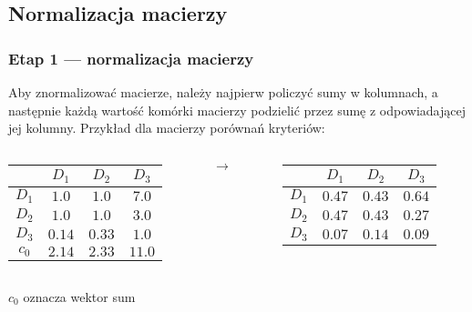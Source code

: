 \documentclass{beamer}
\begin{document}
\subsection{Normalizacja macierzy}
\begin{frame}
\frametitle{Etap 1 --- normalizacja macierzy}
Aby znormalizować macierze, należy najpierw policzyć sumy w kolumnach, a następnie każdą wartość komórki macierzy podzielić przez sumę z odpowiadającej jej kolumny.
Przykład dla macierzy porównań kryteriów:
	\begin{columns}
		\begin{column}{0.4\textwidth}
			\begin{table}
				\begin{tabular}{c|c|c|c}
					&	$D_1$	&	$D_2$	&	$D_3$\\ \hline
				$D_1$	&	$1.0$	&	$1.0$	&	$7.0$\\ \hline
				$D_2$	&	$1.0$	&	$1.0$	&	$3.0$\\ \hline
				$D_3$	&	$0.14$	&	$0.33$	&	$1.0$\\ \hline\hline
				$c_0$	&	$2.14$	&	$2.33$	&	$11.0$
				\end{tabular}
			\end{table}
		\end{column}
		\begin{column}{0.1\textwidth}
			$\rightarrow$
		\end{column}
		\begin{column}{0.4\textwidth}
			\begin{table}
				\begin{tabular}{c|c|c|c}
					&	$D_1$	&	$D_2$	&	$D_3$\\ \hline
				$D_1$	&	$0.47$	&	$0.43$	&	$0.64$\\ \hline
				$D_2$	&	$0.47$	&	$0.43$	&	$0.27$\\ \hline
				$D_3$	&	$0.07$	&	$0.14$	&	$0.09$
				\end{tabular}
			\end{table}
		\end{column}
	\end{columns}
	$c_0$ oznacza wektor sum
\end{frame}
\end{document}

